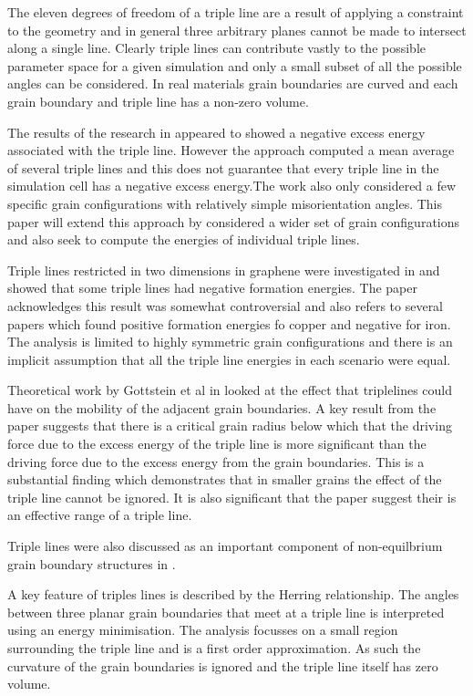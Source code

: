 \documentclass[12pt,a4paper]{book}
\begin{document}
The eleven degrees of freedom of a triple line are a result of applying a constraint to the geometry and in general three arbitrary planes cannot be made to intersect along a single line. Clearly triple lines can contribute vastly to the possible parameter space for a given simulation and only a small subset of all the possible angles can be considered. In real materials grain boundaries are curved and each grain boundary and triple line has a non-zero volume.

The results of the research in \citep{Srinivasan1999} appeared to showed a negative excess energy associated with the triple line. However the approach computed a mean average of several triple lines and this does not guarantee that every triple line in the simulation cell has a negative excess energy.The work also only considered a few specific grain configurations with relatively simple misorientation angles. This paper will extend this approach by considered a wider set of grain configurations and also seek to compute the energies of individual triple lines.

Triple lines restricted in two dimensions in graphene were  investigated in \citep{Hirvonen2017} and showed that some triple lines had negative formation energies. The paper acknowledges this result was somewhat controversial and also refers to several papers which found positive formation energies fo copper and negative for iron. The analysis is limited to highly symmetric grain configurations and there is an implicit assumption that all the triple line energies in each scenario were equal.


Theoretical work by Gottstein et al in \cite{GOTTSTEIN2010914} looked at the effect that triplelines could have on the mobility of the adjacent grain boundaries. A key result from the paper suggests that there is a critical grain radius below which that the driving force due to the excess energy of the triple line is more significant than the driving force due to the excess energy from the grain boundaries. This is a substantial finding which demonstrates that in smaller grains the effect of the triple line cannot be ignored. It is also significant that the paper suggest their is an effective range of a triple line. 

Triple lines were also discussed as an important component of non-equilbrium grain boundary structures in \cite{Nazarov1993}. 

A key feature of triples lines is described by the Herring relationship. The angles between three planar grain boundaries that meet at a triple line is interpreted using an energy minimisation. The analysis focusses on a small region surrounding
the triple line and is a first order approximation. As such the curvature of the grain boundaries is ignored and the triple line itself has zero volume.
\end{document}
